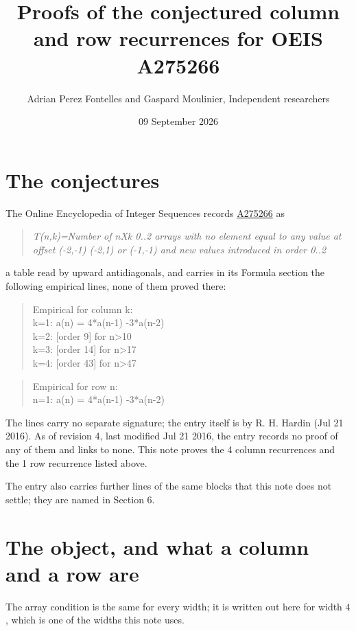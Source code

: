 \documentclass[11pt]{article}
\title{Proofs of the conjectured column and row recurrences for OEIS A275266}
\author{Adrian Perez Fontelles and Gaspard Moulinier, Independent researchers}
\date{09 September 2026}
\theoremstyle{definition}
\begin{document}
\maketitle
\section{The conjectures}

The Online Encyclopedia of Integer Sequences records \href{https://oeis.org/A275266}{A275266} as

\begin{quote}\itshape T(n,k)=Number of nXk 0..2 arrays with no element equal to any value at offset (-2,-1) (-2,1) or (-1,-1) and new values introduced in order 0..2\end{quote}

a table read by upward antidiagonals, and carries in its Formula section the following empirical lines, none of them proved there:

\begin{quote}\ttfamily Empirical for column k:\\
k=1: a(n) = 4*a(n-1) -3*a(n-2)\\k=2: [order 9] for n>10\\k=3: [order 14] for n>17\\k=4: [order 43] for n>47\end{quote}

\begin{quote}\ttfamily Empirical for row n:\\
n=1: a(n) = 4*a(n-1) -3*a(n-2)\end{quote}

The lines carry no separate signature; the entry itself is by R. H. Hardin (Jul 21 2016). As of revision 4, last modified Jul 21 2016, the entry records no proof of any of them and links to none. This note proves the 4 column recurrences and the 1 row recurrence listed above.

The entry also carries further lines of the same blocks that this note does not settle; they are named in Section 6.

\section{The object, and what a column and a row are}

The array condition is the same for every width; it is written out here for width $4$, which is one of the widths this note uses.
\end{document}
